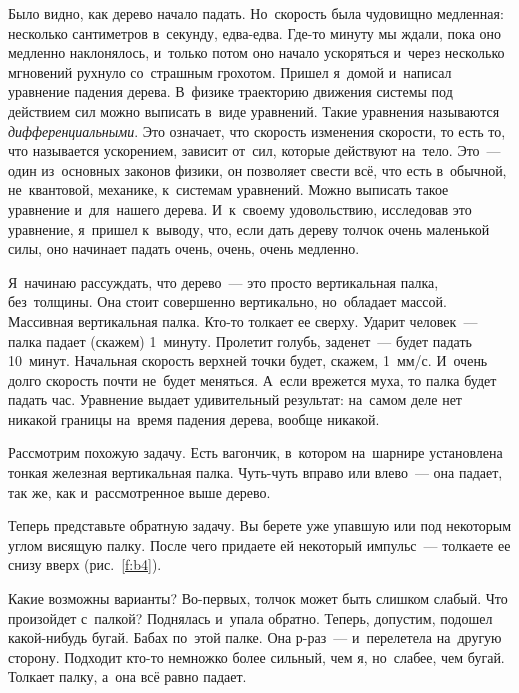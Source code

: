 
Было видно, как дерево начало падать. Но~скорость была чудовищно медленная: несколько сантиметров
в~секунду, едва-едва. Где-то минуту мы ждали, пока оно медленно наклонялось, и~только потом оно
начало ускоряться и~через несколько мгновений рухнуло со~страшным грохотом. Пришел я~домой
и~написал уравнение падения дерева. В~физике траекторию движения системы под действием сил можно
выписать в~виде уравнений. Такие уравнения называются \textit{дифференциальными}. Это означает, что скорость
изменения скорости, то есть то, что называется ускорением, зависит от~сил, которые действуют
на~тело.
 Это~--- один из~основных законов физики, он позволяет свести всё, что есть в~обычной,
не~квантовой, механике, к~системам уравнений. Можно выписать такое уравнение и~для~нашего дерева.
И~к~своему удовольствию, исследовав это уравнение, я~пришел к~выводу, что, если дать дереву толчок
очень маленькой силы, оно начинает падать очень, очень, очень медленно.

Я~начинаю рассуждать, что дерево~--- это просто вертикальная палка, без~толщины. Она стоит
совершенно вертикально, но~обладает массой. Массивная вертикальная палка. Кто-то толкает ее сверху.
Ударит человек~--- палка падает (скажем) 1~минуту. Пролетит голубь, заденет~--- будет падать 10~минут.
Начальная скорость верхней точки будет, скажем, 1~мм/с. И~очень долго скорость почти
не~будет меняться. А~если врежется муха, то палка будет падать час. Уравнение выдает удивительный
результат: на~самом деле нет никакой границы на~время падения дерева, вообще никакой.

Рассмотрим похожую задачу. Есть вагончик, в~котором на~шарнире установлена тонкая железная
вертикальная палка. Чуть-чуть вправо или влево~--- она падает, так же, как и~рассмотренное выше
дерево.


Теперь представьте обратную задачу. Вы берете уже упавшую или под некоторым углом висящую палку.
После чего придаете ей некоторый импульс~--- толкаете ее снизу вверх (рис.~\ref{f:b4}).


Какие возможны варианты? Во-первых, толчок может быть слишком слабый. Что произойдет с~палкой?
Поднялась и~упала обратно. Теперь, допустим, подошел какой-нибудь бугай. Бабах по~этой палке. Она
р-раз~--- и~перелетела на~другую сторону. Подходит кто-то немножко более сильный, чем я, но~слабее,
чем бугай. Толкает палку, а~она всё равно падает.

